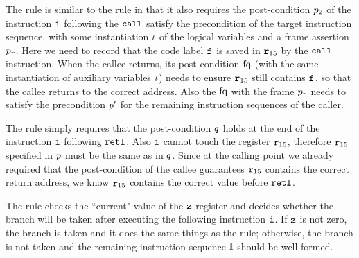 The  rule is similar to the
  rule in that it also requires the
 post-condition $p_2$ of the instruction
 $\texttt{i}$ following the $\texttt{call}$ satisfy the precondition of the target instruction
sequence, with some instantiation $\iota$ of the
logical variables and a frame assertion $p_r$.
Here we need to record that the code label $\texttt{f}_{}$
is saved in $\texttt{r}_{15}$ by the $\texttt{call}$ instruction.
When the callee returns, its post-condition $\text{fq}$
(with
the same instantiation of auxiliary variables $\iota$)
needs to ensure $\texttt{r}_{15}$ still contains $\texttt{f}_{}$,
so that the callee returns to the correct address.
Also the $\text{fq}$ with the frame $p_r$ needs
to satisfy the precondition $p'$ for the
remaining instruction sequences of the caller.

The  rule simply requires that
the post-condition $q$ holds
at the end of the instruction
$\texttt{i}$ following $\texttt{retl}$.
Also $\texttt{i}$ cannot touch the register $\texttt{r}_{15}$,
therefore $\texttt{r}_{15}$ specified in $p$ must be the same
as in $q$.
Since at the calling point we already required that
the post-condition of the callee guarantees $\texttt{r}_{15}$
contains the correct return address,
we know $\texttt{r}_{15}$ contains the correct value
before $\texttt{retl}$.

The  rule checks the ``current" value of the $\texttt{z}$ register
and decides whether the branch will be taken
after executing the following instruction $\texttt{i}{}$. 
If $\texttt{z}$ is not zero,
the branch is taken and it does the same
things as the  rule; otherwise,
the branch is not taken and the remaining instruction
sequence $\mathbb{I}$ should be well-formed.

